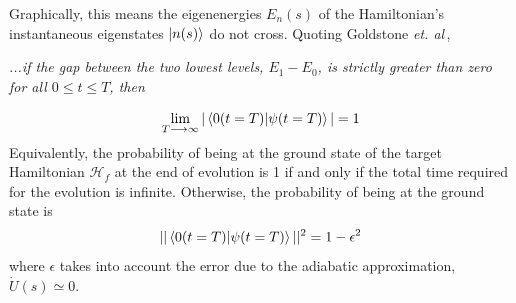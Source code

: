 Graphically, this means the eigenenergies $E_{n}(s)$ of the Hamiltonian's instantaneous eigenstates $\ket{n(s)}$ do not cross.
Quoting Goldstone \textit{et. al}\,\cite{Farhi2000QuantumEvolution},
\begin{displayquote}
\textit{...if the gap between the two lowest levels, $E_{1} - E_{0}$, is strictly greater than zero for all $0 \leq t \leq T$, then}
\end{displayquote}
\begin{equation}
    \lim_{T\longrightarrow \infty} | \braket{0(t=T) | \psi(t=T)}| = 1
\end{equation}
Equivalently, the probability of being at the ground state of the target Hamiltonian $\mathcal{H}_{f}$ at the end of evolution is 1 if and only if the total time required for the evolution is infinite. Otherwise, the probability of being at the ground state is
\begin{equation}
    || \braket{0(t=T) | \psi(t=T)}||^{2} = 1 - \epsilon^{2}
\end{equation}
where $\epsilon$ takes into account the error due to the adiabatic approximation, $\dot{U}(s) \simeq 0$.
